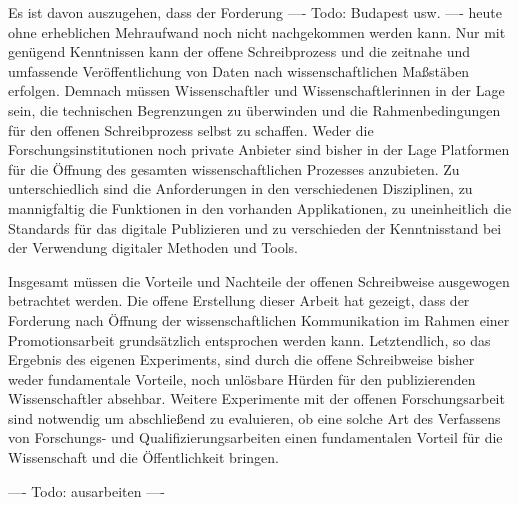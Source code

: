 Es ist davon auszugehen, dass der Forderung ---- Todo: Budapest usw. ---- heute ohne erheblichen Mehraufwand noch nicht nachgekommen werden kann. Nur mit genügend Kenntnissen kann der offene Schreibprozess und die zeitnahe und umfassende Veröffentlichung von Daten nach wissenschaftlichen Maßstäben erfolgen. Demnach müssen Wissenschaftler und Wissenschaftlerinnen in der Lage sein, die technischen Begrenzungen zu überwinden und die Rahmenbedingungen für den offenen Schreibprozess selbst zu schaffen. Weder die Forschungsinstitutionen noch private Anbieter sind bisher in der Lage Platformen für die Öffnung des gesamten wissenschaftlichen Prozesses anzubieten. Zu unterschiedlich sind die Anforderungen in den verschiedenen Disziplinen, zu mannigfaltig die Funktionen in den vorhanden Applikationen, zu uneinheitlich die Standards für das digitale Publizieren und zu verschieden der Kenntnisstand bei der Verwendung digitaler Methoden und Tools.

Insgesamt müssen die Vorteile und Nachteile der offenen Schreibweise ausgewogen betrachtet werden. Die offene Erstellung dieser Arbeit hat gezeigt, dass der Forderung nach Öffnung der wissenschaftlichen Kommunikation im Rahmen einer Promotionsarbeit grundsätzlich entsprochen werden kann. Letztendlich, so das Ergebnis des eigenen Experiments, sind durch die offene Schreibweise bisher weder fundamentale Vorteile, noch unlösbare Hürden für den publizierenden Wissenschaftler absehbar. Weitere Experimente mit der offenen Forschungsarbeit sind notwendig um abschließend zu evaluieren, ob eine solche Art des Verfassens von Forschungs- und Qualifizierungsarbeiten einen fundamentalen Vorteil für die Wissenschaft und die Öffentlichkeit bringen.

---- Todo: ausarbeiten ----
